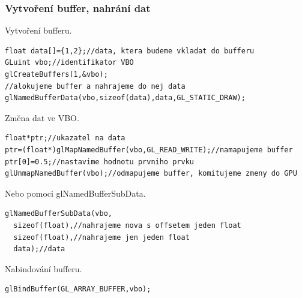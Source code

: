 \begin{frame}[fragile]
\frametitle{Vytvoření buffer, nahrání dat}
Vytvoření bufferu.
    {\scriptsize
\begin{verbatim}
float data[]={1,2};//data, ktera budeme vkladat do bufferu
GLuint vbo;//identifikator VBO
glCreateBuffers(1,&vbo);
//alokujeme buffer a nahrajeme do nej data
glNamedBufferData(vbo,sizeof(data),data,GL_STATIC_DRAW);
    \end{verbatim}
    }
    Změna dat ve VBO.
    {\scriptsize
  \begin{verbatim}
float*ptr;//ukazatel na data
ptr=(float*)glMapNamedBuffer(vbo,GL_READ_WRITE);//namapujeme buffer
ptr[0]=0.5;//nastavime hodnotu prvniho prvku
glUnmapNamedBuffer(vbo);//odmapujeme buffer, komitujeme zmeny do GPU
\end{verbatim}
    }
    Nebo pomoci {\color{blue} glNamedBufferSubData}.
    {\scriptsize
\begin{verbatim}
glNamedBufferSubData(vbo,
  sizeof(float),//nahrajeme nova s offsetem jeden float
  sizeof(float),//nahrajeme jen jeden float
  data);//data
    \end{verbatim}
    }
    Nabindování bufferu.
    {\scriptsize
\begin{verbatim}
glBindBuffer(GL_ARRAY_BUFFER,vbo);
    \end{verbatim}
    }
\end{frame}


